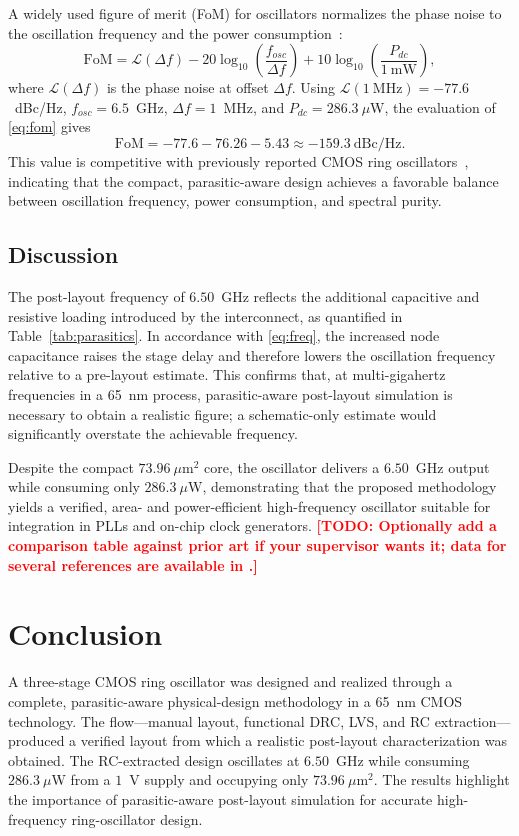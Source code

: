 \documentclass[conference]{IEEEtran}
\newcommand{\TODO}[1]{\textcolor{red}{\textbf{[TODO: #1]}}}
\begin{document}
A widely used figure of merit (FoM) for oscillators normalizes the phase noise
to the oscillation frequency and the power consumption~\cite{nugroho2012cco}:
\begin{equation}
\mathrm{FoM} = \mathcal{L}(\Delta f)
- 20\log_{10}\!\left(\frac{f_{osc}}{\Delta f}\right)
+ 10\log_{10}\!\left(\frac{P_{dc}}{1~\text{mW}}\right),
\label{eq:fom}
\end{equation}
where $\mathcal{L}(\Delta f)$ is the phase noise at offset $\Delta f$. Using
$\mathcal{L}(1~\text{MHz}) = -77.6$~dBc/Hz, $f_{osc} = 6.5$~GHz, $\Delta f =
1$~MHz, and $P_{dc} = 286.3~\mu$W, the evaluation of \eqref{eq:fom} gives
\begin{equation}
\mathrm{FoM} = -77.6 - 76.26 - 5.43 \approx -159.3~\text{dBc/Hz}.
\end{equation}
This value is competitive with previously reported CMOS ring
oscillators~\cite{nugroho2012cco}, indicating that the compact, parasitic-aware
design achieves a favorable balance between oscillation frequency, power
consumption, and spectral purity.

\subsection{Discussion}
The post-layout frequency of $6.50$~GHz reflects the additional capacitive and
resistive loading introduced by the interconnect, as quantified in
Table~\ref{tab:parasitics}. In accordance with \eqref{eq:freq}, the increased
node capacitance raises the stage delay and therefore lowers the oscillation
frequency relative to a pre-layout estimate. This confirms that, at
multi-gigahertz frequencies in a 65~nm process, parasitic-aware post-layout
simulation is necessary to obtain a realistic figure; a schematic-only estimate
would significantly overstate the achievable frequency.

Despite the compact $73.96~\mu$m$^2$ core, the oscillator delivers a $6.50$~GHz
output while consuming only $286.3~\mu$W, demonstrating that the proposed
methodology yields a verified, area- and power-efficient high-frequency
oscillator suitable for integration in PLLs and on-chip clock generators.
\TODO{Optionally add a comparison table against prior art if your supervisor
wants it; data for several references are available in \cite{nugroho2012cco}.}

\section{Conclusion}\label{sec:conclusion}
A three-stage CMOS ring oscillator was designed and realized through a complete,
parasitic-aware physical-design methodology in a 65~nm CMOS technology. The
flow---manual layout, functional DRC, LVS, and RC extraction---produced a
verified layout from which a realistic post-layout characterization was
obtained. The RC-extracted design oscillates at $6.50$~GHz while consuming
$286.3~\mu$W from a $1$~V supply and occupying only $73.96~\mu$m$^2$. The
results highlight the importance of parasitic-aware post-layout simulation for
accurate high-frequency ring-oscillator design.
\end{document}
